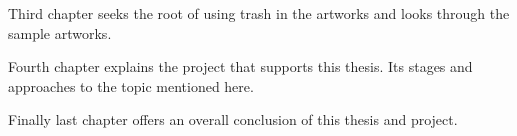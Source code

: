 Third chapter seeks the root of using trash in the artworks and looks through the sample artworks.

Fourth chapter explains the project that supports this thesis. Its stages and approaches to the topic mentioned here.

Finally last chapter offers an overall conclusion of this thesis and project.










